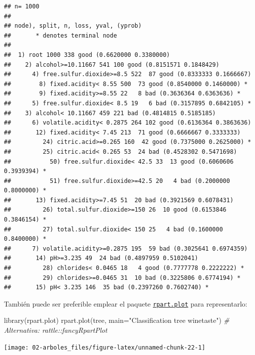 \documentclass[
  spanish,
]{book}
\newenvironment{Shaded}{\begin{snugshade}}{\end{snugshade}}
\newcommand{\AttributeTok}[1]{\textcolor[rgb]{0.77,0.63,0.00}{#1}}
\newcommand{\CommentTok}[1]{\textcolor[rgb]{0.56,0.35,0.01}{\textit{#1}}}
\newcommand{\FunctionTok}[1]{\textcolor[rgb]{0.00,0.00,0.00}{#1}}
\newcommand{\NormalTok}[1]{#1}
\newcommand{\StringTok}[1]{\textcolor[rgb]{0.31,0.60,0.02}{#1}}
\theoremstyle{break}
\theoremstyle{definition}
\theoremstyle{definition}
\theoremstyle{definition}
\theoremstyle{definition}
\theoremstyle{remark}
\begin{document}
\begin{verbatim}
## n= 1000 
## 
## node), split, n, loss, yval, (yprob)
##       * denotes terminal node
## 
##  1) root 1000 338 good (0.6620000 0.3380000)  
##    2) alcohol>=10.11667 541 100 good (0.8151571 0.1848429)  
##      4) free.sulfur.dioxide>=8.5 522  87 good (0.8333333 0.1666667)  
##        8) fixed.acidity< 8.55 500  73 good (0.8540000 0.1460000) *
##        9) fixed.acidity>=8.55 22   8 bad (0.3636364 0.6363636) *
##      5) free.sulfur.dioxide< 8.5 19   6 bad (0.3157895 0.6842105) *
##    3) alcohol< 10.11667 459 221 bad (0.4814815 0.5185185)  
##      6) volatile.acidity< 0.2875 264 102 good (0.6136364 0.3863636)  
##       12) fixed.acidity< 7.45 213  71 good (0.6666667 0.3333333)  
##         24) citric.acid>=0.265 160  42 good (0.7375000 0.2625000) *
##         25) citric.acid< 0.265 53  24 bad (0.4528302 0.5471698)  
##           50) free.sulfur.dioxide< 42.5 33  13 good (0.6060606 0.3939394) *
##           51) free.sulfur.dioxide>=42.5 20   4 bad (0.2000000 0.8000000) *
##       13) fixed.acidity>=7.45 51  20 bad (0.3921569 0.6078431)  
##         26) total.sulfur.dioxide>=150 26  10 good (0.6153846 0.3846154) *
##         27) total.sulfur.dioxide< 150 25   4 bad (0.1600000 0.8400000) *
##      7) volatile.acidity>=0.2875 195  59 bad (0.3025641 0.6974359)  
##       14) pH>=3.235 49  24 bad (0.4897959 0.5102041)  
##         28) chlorides< 0.0465 18   4 good (0.7777778 0.2222222) *
##         29) chlorides>=0.0465 31  10 bad (0.3225806 0.6774194) *
##       15) pH< 3.235 146  35 bad (0.2397260 0.7602740) *
\end{verbatim}

También puede ser preferible emplear el paquete \href{https://CRAN.R-project.org/package=rpart.plot}{\texttt{rpart.plot}} para representarlo:

\begin{Shaded}
\begin{Highlighting}[]
\FunctionTok{library}\NormalTok{(rpart.plot)}
\FunctionTok{rpart.plot}\NormalTok{(tree, }\AttributeTok{main=}\StringTok{"Classification tree winetaste"}\NormalTok{) }\CommentTok{\# Alternativa: rattle::fancyRpartPlot}
\end{Highlighting}
\end{Shaded}

\begin{center}\texttt{[image: 02-arboles\_files/figure-latex/unnamed-chunk-22-1]} \end{center}
\end{document}

